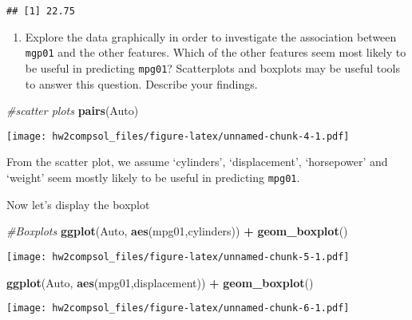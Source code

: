 \documentclass[]{article}
\newenvironment{Shaded}{\begin{snugshade}}{\end{snugshade}}
\newcommand{\CommentTok}[1]{\textcolor[rgb]{0.56,0.35,0.01}{\textit{#1}}}
\newcommand{\KeywordTok}[1]{\textcolor[rgb]{0.13,0.29,0.53}{\textbf{#1}}}
\newcommand{\NormalTok}[1]{#1}
\newcommand{\OperatorTok}[1]{\textcolor[rgb]{0.81,0.36,0.00}{\textbf{#1}}}
\newcommand{\StringTok}[1]{\textcolor[rgb]{0.31,0.60,0.02}{#1}}
\providecommand{\tightlist}{%
  \setlength{\itemsep}{0pt}\setlength{\parskip}{0pt}}
\begin{document}
\begin{verbatim}
## [1] 22.75
\end{verbatim}

\begin{enumerate}
\def\labelenumi{(\alph{enumi})}
\setcounter{enumi}{1}
\tightlist
\item
  Explore the data graphically in order to investigate the association
  between \texttt{mgp01} and the other features. Which of the other
  features seem most likely to be useful in predicting \texttt{mpg01}?
  Scatterplots and boxplots may be useful tools to answer this question.
  Describe your findings.
\end{enumerate}

\begin{Shaded}
\begin{Highlighting}[]
\CommentTok{#scatter plots}
\KeywordTok{pairs}\NormalTok{(Auto)}
\end{Highlighting}
\end{Shaded}

\texttt{[image: hw2compsol\_files/figure-latex/unnamed-chunk-4-1.pdf]}

From the scatter plot, we assume `cylinders', `displacement',
`horsepower' and `weight' seem mostly likely to be useful in predicting
\texttt{mpg01}.

\newpage

Now let's display the boxplot

\begin{Shaded}
\begin{Highlighting}[]
\CommentTok{#Boxplots}
\KeywordTok{ggplot}\NormalTok{(Auto, }\KeywordTok{aes}\NormalTok{(mpg01,cylinders)) }\OperatorTok{+}\StringTok{ }\KeywordTok{geom_boxplot}\NormalTok{()}
\end{Highlighting}
\end{Shaded}

\texttt{[image: hw2compsol\_files/figure-latex/unnamed-chunk-5-1.pdf]}
\newpage

\begin{Shaded}
\begin{Highlighting}[]
\KeywordTok{ggplot}\NormalTok{(Auto, }\KeywordTok{aes}\NormalTok{(mpg01,displacement)) }\OperatorTok{+}\StringTok{ }\KeywordTok{geom_boxplot}\NormalTok{()}
\end{Highlighting}
\end{Shaded}

\texttt{[image: hw2compsol\_files/figure-latex/unnamed-chunk-6-1.pdf]}
\newpage
\end{document}
